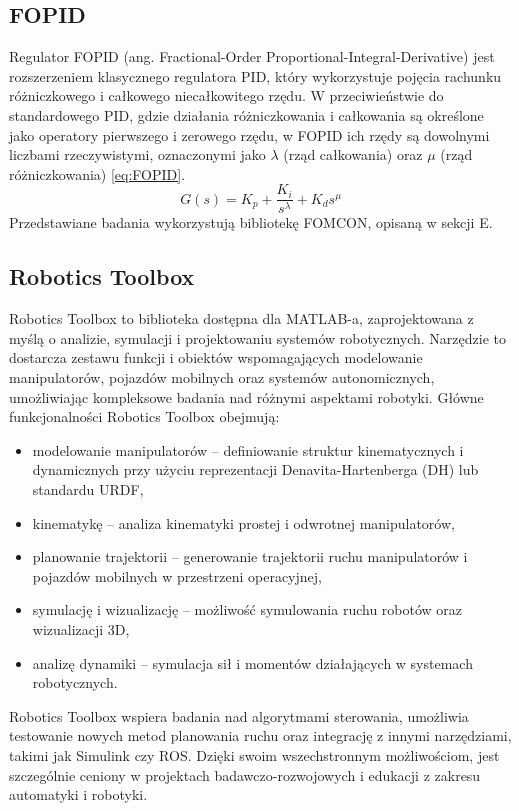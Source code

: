 \documentclass[journal,twoside,web]{ieeecolor}
\begin{document}
\subsection{FOPID}
Regulator FOPID (ang. Fractional-Order Proportional-Integral-Derivative) jest rozszerzeniem klasycznego regulatora PID, który wykorzystuje pojęcia rachunku różniczkowego i całkowego niecałkowitego rzędu. W przeciwieństwie do standardowego PID, gdzie działania różniczkowania i całkowania są określone jako operatory pierwszego i zerowego rzędu, w FOPID ich rzędy są dowolnymi liczbami rzeczywistymi, oznaczonymi jako $\lambda$ (rząd całkowania) oraz $\mu$ (rząd różniczkowania) \eqref{eq:FOPID}.
\begin{equation}
	G(s) = K_{p} + \frac{K_{i}}{s^{\lambda}} + K_{d}s^{\mu}
	\label{eq:FOPID}
\end{equation} 
Przedstawiane badania wykorzystują bibliotekę FOMCON, opisaną w sekcji E. 
\subsection{Robotics Toolbox}
Robotics Toolbox to biblioteka dostępna dla MATLAB-a, zaprojektowana z myślą o analizie, symulacji i projektowaniu systemów robotycznych. Narzędzie to dostarcza zestawu funkcji i obiektów wspomagających modelowanie manipulatorów, pojazdów mobilnych oraz systemów autonomicznych, umożliwiając kompleksowe badania nad różnymi aspektami robotyki. Główne funkcjonalności Robotics Toolbox obejmują:

\begin{itemize}
	\item modelowanie manipulatorów – definiowanie struktur kinematycznych i dynamicznych przy użyciu reprezentacji Denavita-Hartenberga (DH) lub standardu URDF,
	\item kinematykę – analiza kinematyki prostej i odwrotnej manipulatorów,
	\item planowanie trajektorii – generowanie trajektorii ruchu manipulatorów i pojazdów mobilnych w przestrzeni operacyjnej,
	\item symulację i wizualizację – możliwość symulowania ruchu robotów oraz wizualizacji 3D,
	\item analizę dynamiki – symulacja sił i momentów działających w systemach robotycznych.
\end{itemize}
Robotics Toolbox wspiera badania nad algorytmami sterowania, umożliwia testowanie nowych metod planowania ruchu oraz integrację z innymi narzędziami, takimi jak Simulink czy ROS. Dzięki swoim wszechstronnym możliwościom, jest szczególnie ceniony w projektach badawczo-rozwojowych i edukacji z zakresu automatyki i robotyki. \href{https://www.mathworks.com/help/robotics/}{\cite{Robotics Toolbox}}
\end{document}
